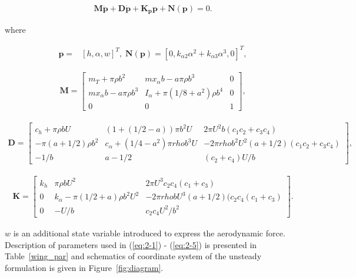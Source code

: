 \documentclass[openacc]{rsproca_new}%
\def\vec#1{\ensuremath{\mathbf{#1}}}
\newcommand{\Eref}[1]{(\ref{#1})}
\newcommand{\Fref}[1]{Figure~\ref{#1}}
\newcommand{\Tref}[1]{Table~\ref{#1}}
\begin{document}
\begin{align}\label{eq:2-1}
\vec{M} \ddot{\vec{p}} + \vec{D} \dot{\vec{p}} +\vec{K_p} \vec{p} + \vec{N}(\vec{p}) =0.
\end{align}

\noindent where

\begin{align}\label{eq:2-2}
\vec{p}=&[h,\alpha,w]^T, \; \vec{N}(\vec{p})=[0,k_{\alpha 2}\alpha^2+k_{\alpha 3}\alpha^3,0]^T,
\end{align}

\begin{align}\label{eq:2-3}
\vec{M}=
\begin{bmatrix}
    m_T+\pi \rho b^2       & m x_\alpha b-a\pi\rho b^3 & 0 \\
    m x_\alpha b-a\pi\rho b^3       & I_\alpha+\pi(1/8+a^2)\rho b^4 & 0 \\
    0       & 0 & 1
\end{bmatrix},
\end{align}

\begin{align}\label{eq:2-4}
\vec D=
\begin{bmatrix}
      c_h+\pi \rho b U        & (1+(1/2-a))\pi b^2 U & 2 \pi U^2 b (c_1c_2+c_3c_4) \\
      -\pi (a+1/2)\rho b^2        & c_\alpha+(1/4-a^2)\pi rho b^3 U & -2 \pi rho b^2 U^2 (a+1/2)(c_1c_2+c_3c_4) \\
      -1/b       & a-1/2 & (c_2+c_4)U/b
\end{bmatrix},
\end{align}

\begin{align}\label{eq:2-5}
\vec K=
\begin{bmatrix}
      k_h        & \pi \rho b U^2  & 2 \pi U^3 c_2 c_4 (c_1+c_3) \\
      0         & k_\alpha - \pi (1/2+a)\rho b^2 U^2 & -2 \pi rho b U^3 (a+1/2)(c_2c_4(c_1+c_3) \\
      0       & -U/b & c_2 c_4U^2/b^2
\end{bmatrix}.
\end{align}

\noindent $w$ is an additional state variable introduced to express the aerodynamic force. Description of parameters used in \Eref{eq:2-1} - \Eref{eq:2-5} is presented in \Tref{wing_par} and schematics of coordinate system of the unsteady formulation is given in \Fref{fig:diagram}.
\end{document}
